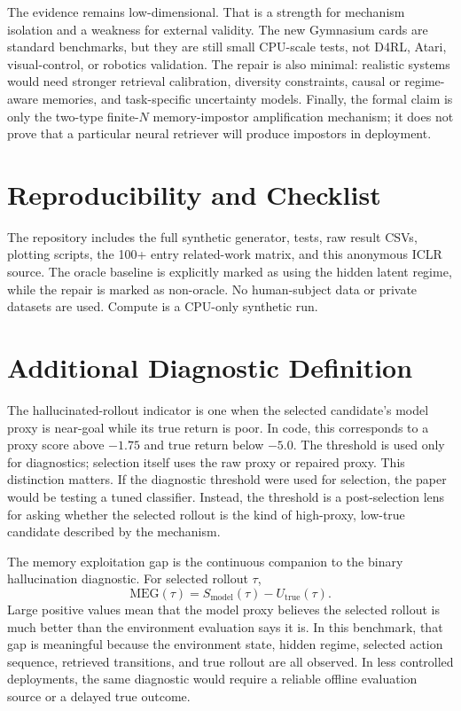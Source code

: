 \documentclass{article}
\newcommand{\meg}{\mathrm{MEG}}
\begin{document}
The evidence remains low-dimensional. That is a strength for mechanism
isolation and a weakness for external validity. The new Gymnasium cards are
standard benchmarks, but they are still small CPU-scale tests, not D4RL, Atari,
visual-control, or robotics validation. The repair is also minimal: realistic
systems would need stronger retrieval calibration, diversity constraints,
causal or regime-aware memories, and task-specific uncertainty models. Finally,
the formal claim is only the two-type finite-$N$ memory-impostor amplification
mechanism; it does not prove that a particular neural retriever will produce
impostors in deployment.

\section{Reproducibility and Checklist}

The repository includes the full synthetic generator, tests, raw result CSVs,
plotting scripts, the 100+ entry related-work matrix, and this anonymous ICLR
source. The oracle baseline is explicitly marked as using the hidden latent
regime, while the repair is marked as non-oracle. No human-subject data or
private datasets are used. Compute is a CPU-only synthetic run.




\appendix
\setcounter{section}{0}
\renewcommand{\thesection}{App.\arabic{section}}
\section{Additional Diagnostic Definition}
\label{app:diagnostics}

The hallucinated-rollout indicator is one when the selected candidate's model
proxy is near-goal while its true return is poor. In code, this corresponds to
a proxy score above $-1.75$ and true return below $-5.0$. The threshold is used
only for diagnostics; selection itself uses the raw proxy or repaired proxy.
This distinction matters. If the diagnostic threshold were used for selection,
the paper would be testing a tuned classifier. Instead, the threshold is a
post-selection lens for asking whether the selected rollout is the kind of
high-proxy, low-true candidate described by the mechanism.

The memory exploitation gap is the continuous companion to the binary
hallucination diagnostic. For selected rollout $\tau$,
\[
\meg(\tau)=S_{\mathrm{model}}(\tau)-U_{\mathrm{true}}(\tau).
\]
Large positive values mean that the model proxy believes the selected rollout
is much better than the environment evaluation says it is. In this benchmark,
that gap is meaningful because the environment state, hidden regime, selected
action sequence, retrieved transitions, and true rollout are all observed. In
less controlled deployments, the same diagnostic would require a reliable
offline evaluation source or a delayed true outcome.
\end{document}
